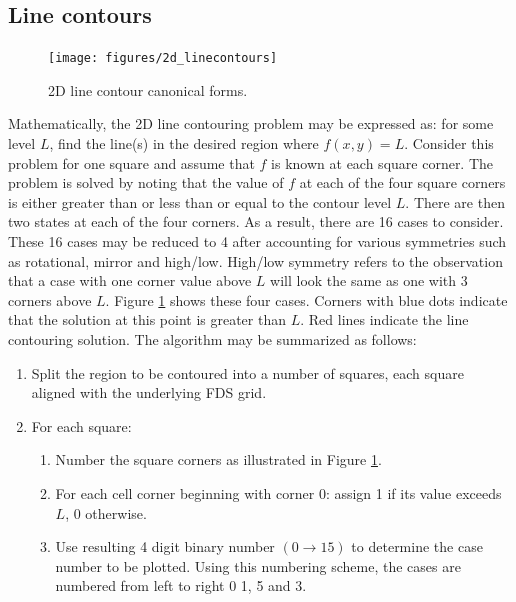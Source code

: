 \documentclass[11pt,twoside]{book}
\newcommand{\figoptions}{htp}
\begin{document}
\subsection{Line contours}
\begin{figure}[\figoptions]
\begin{center}
\texttt{[image: figures/2d\_linecontours]}
\end{center}
\caption{2D line contour canonical forms.
  }
\label{fig2dline}%
\end{figure}
Mathematically, the 2D line contouring problem may be expressed as: for some level $L$, find the line(s) in the desired region where $f(x,y)=L$.  Consider this problem for one square and assume that $f$ is known at each square corner.  The problem is solved by noting that the value of $f$ at each of the four square corners is either greater than or less than or equal to the contour level $L$.  There are then two states at each of the four corners.  As a result, there are 16 cases to consider.  These 16 cases may be reduced to 4 after accounting for various symmetries such as rotational, mirror and high/low.  High/low symmetry refers to the observation that a case with one corner value above $L$ will look the same as one with 3 corners above $L$.
Figure \ref{fig2dline} shows these four cases.  Corners with blue dots indicate that the solution at this point is greater than $L$.  Red lines indicate the line contouring solution.  The algorithm may be summarized as follows:
\begin{enumerate}
\item Split the region to be contoured into a number of squares, each square aligned with the underlying FDS grid.
\item For  each square:
\begin{enumerate}
\item Number the square corners as illustrated in Figure \ref{fig2dline}.
\item For each cell corner beginning with corner 0: assign 1 if its value exceeds $L$, 0 otherwise.
\item Use resulting 4 digit binary number $(0\rightarrow 15)$ to determine the case number to be plotted.  Using this numbering scheme, the cases are numbered from left to right 0 1, 5 and 3.
\end{enumerate}
\end{enumerate}
\end{document}

